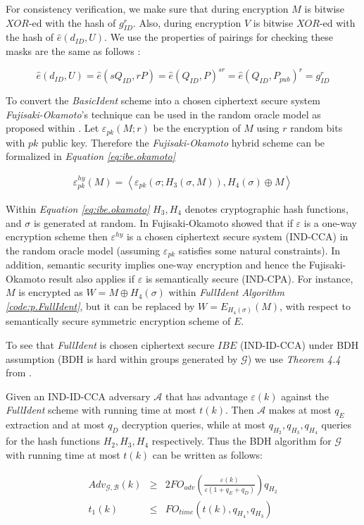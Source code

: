 For consistency verification, we make sure that during encryption $M$ is bitwise $XOR$-ed with the hash of $g^r_{ID}$. Also, during encryption $V$ is bitwise $XOR$-ed with the hash of $\hat{e}(d_{ID}, U)$. We use the properties of pairings for checking these masks are the same as follows \cite{BF01}: 

\begin{equation}
	\hat{e}(d_{ID}, U) = \hat{e}(sQ_{ID}, rP) = \hat{e}(Q_{ID}, P)^{sr}= \hat{e}(Q_{ID}, P_{pub})^r = g^r_{ID}
\end{equation}

To convert the \textit{BasicIdent}\cite{BF01} scheme into a chosen ciphertext secure 
system \textit{Fujisaki-Okamoto}'s technique can be used in the random oracle model as proposed within \cite{FujisakiOkamoto}. Let $\varepsilon_{pk}(M;r) $ be the encryption of $M$ using $r$ random bits with $pk$ public key. Therefore the \textit{Fujisaki-Okamoto} hybrid scheme can be formalized  in  \textit{Equation \ref{eq:ibe.okamoto}}

\begin{eqnarray}
	\label{eq:ibe.okamoto}
	\varepsilon^{hy}_{pk}(M) = \left< \varepsilon_{pk}(\sigma;H_3(\sigma,M)), H_4(\sigma) \oplus M \right> 
\end{eqnarray}


Within \textit{Equation \ref{eq:ibe.okamoto}} $H_3, H_4$ denotes cryptographic hash functions, and $\sigma$ is generated at random. In \cite{FujisakiOkamoto} Fujisaki-Okamoto showed that if $\varepsilon$ is a one-way encryption scheme then $\varepsilon^{hy}$ is a chosen ciphertext secure system (IND-CCA) in the
random oracle model (assuming $\varepsilon_{pk}$ satisfies some natural constraints). In addition, semantic security implies one-way encryption and hence the Fujisaki-Okamoto result also applies if $\varepsilon$ is semantically secure (IND-CPA). For instance, $M$ is encrypted as $W = M \oplus H_4(\sigma)$ within \textit{FullIdent Algorithm \ref{code:p.FullIdent}}, but it can be replaced by $W = E_{H_4(\sigma)}(M)$, with respect to semantically secure symmetric encryption scheme of $E$. \cite{BF01}

To see that \textit{FullIdent} is chosen ciphertext secure $IBE$ (IND-ID-CCA) under BDH assumption (BDH is hard within groups generated by $\mathcal{G}$) we use \textit{Theorem 4.4} from \cite{BF01}.

Given an IND-ID-CCA adversary $\mathcal{A}$ that has advantage $\varepsilon(k)$ against the \textit{FullIdent} scheme with running time at most $t(k)$. Then $\mathcal{A}$ makes at most $q_E$ extraction and at most $q_D$ decryption queries, 
while at most $q_{H_2}, q_{H_3}, q_{H_4}$ queries for the hash functions $H_2, H_3, H_4$ respectively. Thus the BDH algorithm for $\mathcal{G}$ with running time at most $t(k)$ can be  written\cite{BF01} as follows:  


\begin{eqnarray}
	\label{eq:hashcca}
	 Adv_{\mathcal{G},\mathcal{B}} (k) & \geq & 2 FO_{adv} \left( \frac{\varepsilon(k)}{\varepsilon(1+q_E+q_D)} \right)q_{H_2} \\
	t_1(k)& \leq & FO_{time}(t(k), q_{H_4}, q_{H_3})
\end{eqnarray}

